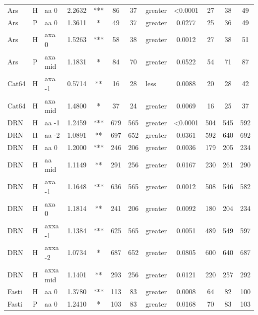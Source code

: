 \documentclass[twocolumn, switch, a4paper]{article} %
\begin{document}
\begin{table}[h!]
\begin{adjustbox}{totalheight=0.9\textheight}
\begin{tabular}{lclcccclcc@{\hspace{1\tabcolsep}}c@{\hspace{1\tabcolsep}}c}
           Ars &     H &      aa 0 & 2.2632 &   *** &    86 &        37 &     greater & <0.0001 &    27 &    38 &    49 \\
           Ars &     P &      aa 0 & 1.3611 &     * &    49 &        37 &     greater & 0.0277 &    25 &    36 &    49 \\
           Ars &     H &     axa 0 & 1.5263 &   *** &    58 &        38 &     greater & 0.0012 &    27 &    38 &    51 \\
           Ars &     P &   axa mid & 1.1831 &     * &    84 &        70 &     greater & 0.0522 &    54 &    71 &    87 \\
         Cat64 &     H &    axa -1 & 0.5714 &    ** &    16 &        28 &        less & 0.0088 &    20 &    28 &    42 \\
         Cat64 &     H &   axa mid & 1.4800 &     * &    37 &        24 &     greater & 0.0069 &    16 &    25 &    37 \\
           DRN &     H &     aa -1 & 1.2459 &   *** &   679 &       565 &     greater & <0.0001 &   504 &   545 &   592 \\
           DRN &     H &     aa -2 & 1.0891 &    ** &   697 &       652 &     greater & 0.0361 &   592 &   640 &   692 \\
           DRN &     H &      aa 0 & 1.2000 &   *** &   246 &       206 &     greater & 0.0036 &   179 &   205 &   234 \\
           DRN &     H &    aa mid & 1.1149 &    ** &   291 &       256 &     greater & 0.0167 &   230 &   261 &   290 \\
           DRN &     H &    axa -1 & 1.1648 &   *** &   636 &       565 &     greater & 0.0012 &   508 &   546 &   582 \\
           DRN &     H &     axa 0 & 1.1814 &    ** &   241 &       206 &     greater & 0.0092 &   180 &   204 &   234 \\
           DRN &     H &   axxa -1 & 1.1384 &   *** &   625 &       565 &     greater & 0.0051 &   489 &   549 &   597 \\
           DRN &     H &   axxa -2 & 1.0734 &     * &   687 &       652 &     greater & 0.0805 &   600 &   640 &   687 \\
           DRN &     H &  axxa mid & 1.1401 &    ** &   293 &       256 &     greater & 0.0121 &   220 &   257 &   292 \\
         Fasti &     H &      aa 0 & 1.3780 &   *** &   113 &        83 &     greater & 0.0008 &    64 &    82 &   100 \\
         Fasti &     P &      aa 0 & 1.2410 &     * &   103 &        83 &     greater & 0.0168 &    70 &    83 &   103 \\

\end{tabular}
\end{adjustbox}
\end{table}
\end{document}
